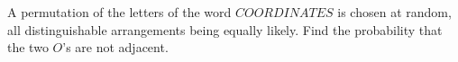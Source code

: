 A permutation of the letters of the word $COORDINATES$ is chosen at random, all distinguishable arrangements being equally likely. Find the probability that the two $O$'s are not adjacent.
